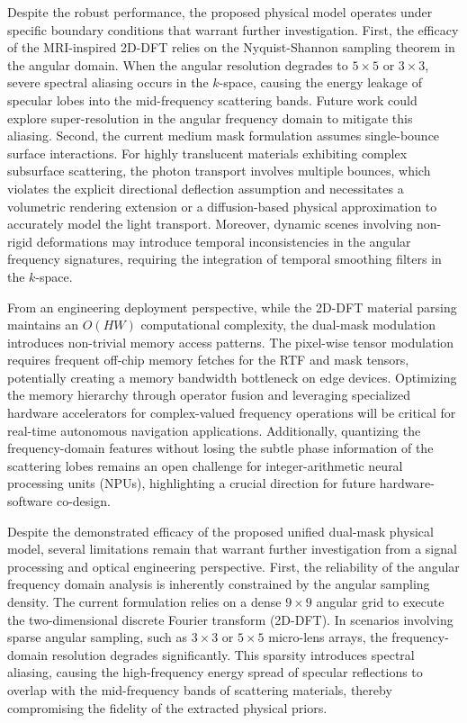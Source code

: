 \documentclass[lettersize,journal]{IEEEtran}
\begin{document}
{Despite the robust performance, the proposed physical model operates under specific boundary conditions that warrant further investigation. First, the efficacy of the MRI-inspired 2D-DFT relies on the Nyquist-Shannon sampling theorem in the angular domain. When the angular resolution degrades to $5 \times 5$ or $3 \times 3$, severe spectral aliasing occurs in the $k$-space, causing the energy leakage of specular lobes into the mid-frequency scattering bands. Future work could explore super-resolution in the angular frequency domain to mitigate this aliasing. Second, the current medium mask formulation assumes single-bounce surface interactions. For highly translucent materials exhibiting complex subsurface scattering, the photon transport involves multiple bounces, which violates the explicit directional deflection assumption and necessitates a volumetric rendering extension or a diffusion-based physical approximation to accurately model the light transport. Moreover, dynamic scenes involving non-rigid deformations may introduce temporal inconsistencies in the angular frequency signatures, requiring the integration of temporal smoothing filters in the $k$-space.

From an engineering deployment perspective, while the 2D-DFT material parsing maintains an $O(HW)$ computational complexity, the dual-mask modulation introduces non-trivial memory access patterns. The pixel-wise tensor modulation requires frequent off-chip memory fetches for the RTF and mask tensors, potentially creating a memory bandwidth bottleneck on edge devices. Optimizing the memory hierarchy through operator fusion and leveraging specialized hardware accelerators for complex-valued frequency operations will be critical for real-time autonomous navigation applications. Additionally, quantizing the frequency-domain features without losing the subtle phase information of the scattering lobes remains an open challenge for integer-arithmetic neural processing units (NPUs), highlighting a crucial direction for future hardware-software co-design.

Despite the demonstrated efficacy of the proposed unified dual-mask physical model, several limitations remain that warrant further investigation from a signal processing and optical engineering perspective. First, the reliability of the angular frequency domain analysis is inherently constrained by the angular sampling density. The current formulation relies on a dense $9 \times 9$ angular grid to execute the two-dimensional discrete Fourier transform (2D-DFT). In scenarios involving sparse angular sampling, such as $3 \times 3$ or $5 \times 5$ micro-lens arrays, the frequency-domain resolution degrades significantly. This sparsity introduces spectral aliasing, causing the high-frequency energy spread of specular reflections to overlap with the mid-frequency bands of scattering materials, thereby compromising the fidelity of the extracted physical priors.

}
\end{document}
